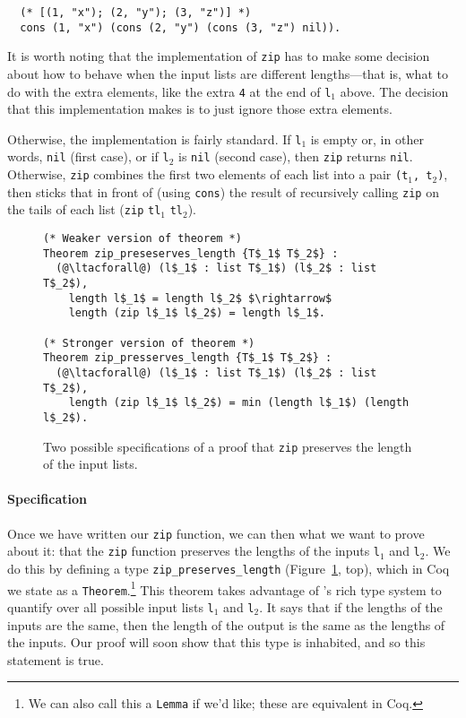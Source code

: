 \begin{lstlisting}
  (* [(1, "x"); (2, "y"); (3, "z")] *)
  cons (1, "x") (cons (2, "y") (cons (3, "z") nil)).
\end{lstlisting}

It is worth noting that the implementation of \lstinline{zip} has to make some decision about
how to behave when the input lists are different lengths---that is, what to do with the extra elements,
like the extra \lstinline{4} at the end of \lstinline{l}$_1$ above.
The decision that this implementation makes is to just ignore those extra elements.

Otherwise, the implementation is fairly standard.
If \lstinline{l}$_1$ is empty or, in other words, \lstinline{nil} (first case),
or if \lstinline{l}$_2$ is \lstinline{nil} (second case), 
then \lstinline{zip} returns \lstinline{nil}.
Otherwise,
\lstinline{zip} combines the first two elements of each list into a pair \lstinline{(t}$_1$\lstinline{, t}$_2$\lstinline{)},
then sticks that in front of (using \lstinline{cons}) the result of recursively calling \lstinline{zip} on the tails of each list
(\lstinline{zip} \lstinline{tl}$_1$ \lstinline{tl}$_2$). %

\begin{figure}
\begin{lstlisting}
(* Weaker version of theorem *)
Theorem zip_preseserves_length {T$_1$ T$_2$} :
  (@\ltacforall@) (l$_1$ : list T$_1$) (l$_2$ : list T$_2$),
    length l$_1$ = length l$_2$ $\rightarrow$
    length (zip l$_1$ l$_2$) = length l$_1$.

(* Stronger version of theorem *)
Theorem zip_presserves_length {T$_1$ T$_2$} :
  (@\ltacforall@) (l$_1$ : list T$_1$) (l$_2$ : list T$_2$),
    length (zip l$_1$ l$_2$) = min (length l$_1$) (length l$_2$).
\end{lstlisting}
\caption{Two possible specifications of a proof that \lstinline{zip} preserves the length of the input lists.}
\label{fig:zip-pres}
\end{figure}

\paragraph{Specification} Once we have written our \lstinline{zip} function, we can then  what we 
want to prove about it: that the \lstinline{zip} function preserves the lengths of the inputs \lstinline{l}$_1$ and \lstinline{l}$_2$.
We do this by defining a type \lstinline{zip_preserves_length} (Figure~\ref{fig:zip-pres}, top), which in Coq 
we state as a \lstinline{Theorem}.\footnote{We can also call this a \lstinline{Lemma} if we'd like; these are equivalent in Coq.}
This theorem takes advantage of 's rich type system to quantify over all possible input lists \lstinline{l}$_1$ and \lstinline{l}$_2$.
It says that if the lengths of the inputs are the same, then the length of the output is the same as the lengths of the inputs.
Our proof will soon show that this type is inhabited, and so this statement is true.


